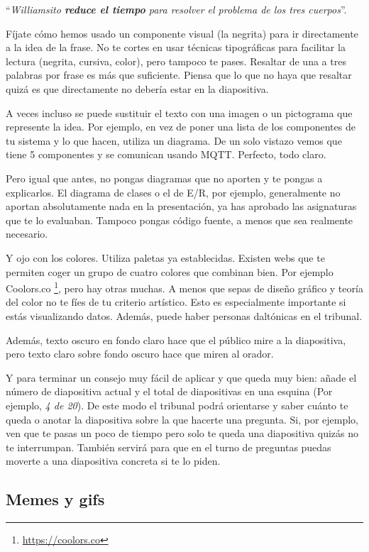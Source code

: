``\textit{Williamsito \textbf{reduce el tiempo} para resolver el problema de los tres cuerpos}''. 

Fíjate cómo hemos usado un componente visual (la negrita) para ir directamente a la idea de la frase. No te cortes en usar técnicas tipográficas para facilitar la lectura (negrita, cursiva, color), pero tampoco te pases. Resaltar de una a tres palabras por frase es más que suficiente. Piensa que lo que no haya que resaltar quizá es que directamente no debería estar en la diapositiva.

A veces incluso se puede sustituir el texto con una imagen o un pictograma que represente la idea. Por ejemplo, en vez de poner una lista de los componentes de tu sistema y lo que hacen, utiliza un diagrama. De un solo vistazo vemos que tiene 5 componentes y se comunican usando MQTT. Perfecto, todo claro. 

Pero igual que antes, no pongas diagramas que no aporten y te pongas a explicarlos. El diagrama de clases o el de E/R, por ejemplo, generalmente no aportan absolutamente nada en la presentación, ya has aprobado las asignaturas que te lo evaluaban. Tampoco pongas código fuente, a menos que sea realmente necesario.

Y ojo con los colores. Utiliza paletas ya establecidas. Existen webs que te permiten coger un grupo de cuatro colores que combinan bien. Por ejemplo Coolors.co \footnote{\url{https://coolors.co}}, pero hay otras muchas. A menos que sepas de diseño gráfico y teoría del color no te fíes de tu criterio artístico. Esto es especialmente importante si estás visualizando datos. Además, puede haber personas daltónicas en el tribunal.

Además, texto oscuro en fondo claro hace que el público mire a la diapositiva, pero texto claro sobre fondo oscuro hace que miren al orador.

Y para terminar un consejo muy fácil de aplicar y que queda muy bien: añade el número de diapositiva actual y el total de diapositivas en una esquina (Por ejemplo, \textit{4 de 20}). De este modo el tribunal podrá orientarse y saber cuánto te queda o anotar la diapositiva sobre la que hacerte una pregunta. Si, por ejemplo, ven que te pasas un poco de tiempo pero solo te queda una diapositiva quizás no te interrumpan. También servirá para que en el turno de preguntas puedas moverte a una diapositiva concreta si te lo piden.

\subsection{Memes y gifs}

